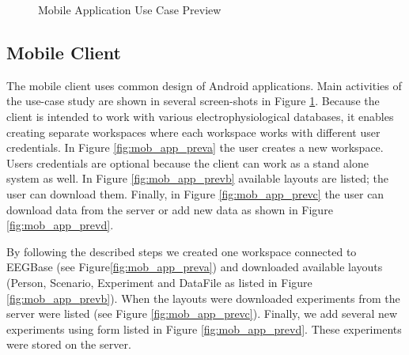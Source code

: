 \documentclass[a4paper,twoside]{article}
\begin{document}
\begin{figure}
\begin{tabular}{c}
\end{tabular}
\caption{Mobile Application Use Case Preview}
\label{fig:mob_app_prev}
\end{figure}

\subsection{Mobile Client} \label{Mobile_Client}

The mobile client uses common design of Android applications. Main activities of the use-case study are shown in several screen-shots in Figure \ref{fig:mob_app_prev}. Because the client is intended to work with various electrophysiological databases, it enables creating separate workspaces where each workspace works with different user credentials. In Figure \ref{fig:mob_app_preva} the user creates a new workspace. Users credentials are optional because the client can work as a stand alone system as well. In Figure \ref{fig:mob_app_prevb} available layouts are listed; the user can download them. Finally, in Figure \ref{fig:mob_app_prevc} the user can download data from the server or add new data as shown in Figure \ref{fig:mob_app_prevd}.

By following the described steps we created one workspace connected to EEGBase (see Figure\ref{fig:mob_app_preva}) and downloaded available layouts (Person, Scenario, Experiment and DataFile as listed in Figure \ref{fig:mob_app_prevb}). When the layouts were downloaded experiments from the server were listed (see Figure \ref{fig:mob_app_prevc}). Finally, we add several new experiments using form listed in Figure \ref{fig:mob_app_prevd}. These experiments were stored on the server.



%
%
\end{document}
